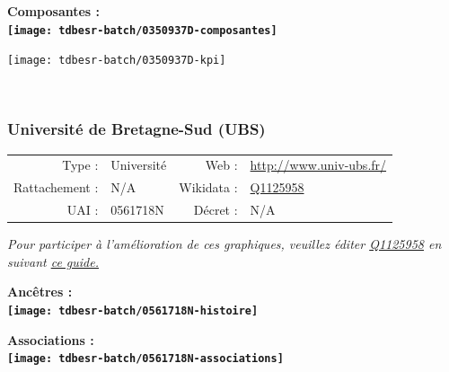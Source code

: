 \documentclass[12pt,french,]{article}
\begin{document}
\hrulefill

\begin{center} \bf Composantes : \\  
\texttt{[image: tdbesr-batch/0350937D-composantes]} \end{center}

\begin{center}\texttt{[image: tdbesr-batch/0350937D-kpi]} \end{center}\checkoddpage

\ifoddpage \fi ~\newpage  

\hypertarget{universituxe9-de-bretagne-sud-ubs}{%
\subsubsection{Université de Bretagne-Sud
(UBS)}\label{universituxe9-de-bretagne-sud-ubs}}

\begin{tabular*}{\textwidth}{rp{5cm}rl}  
\hline  
Type : & Université & Web : &\href{http://www.univ-ubs.fr/}{http://www.univ-ubs.fr/} \\  
Rattachement : & N/A & Wikidata : & \href{https://www.wikidata.org/entity/Q1125958}{Q1125958} \\  
UAI : & 0561718N & Décret : & N/A \\  
\hline  
\end{tabular*}

\textit{\scriptsize Pour participer à l'amélioration de ces graphiques, veuillez éditer  \href{https://www.wikidata.org/entity/Q1125958}{Q1125958}  en suivant \href{https://github.com/cpesr/wikidataESR/blob/master/Rmd/wikidataESR.md}{ce guide.}}

\vspace{1cm}  
\begin{minipage}[b]{0.50\textwidth}\begin{center} \bf Ancêtres : \\  
\texttt{[image: tdbesr-batch/0561718N-histoire]} \end{center}\end{minipage}\begin{minipage}[b]{0.50\textwidth}\begin{center} \bf Associations : \\  
\texttt{[image: tdbesr-batch/0561718N-associations]} \end{center}\end{minipage}

\hrulefill
\end{document}
